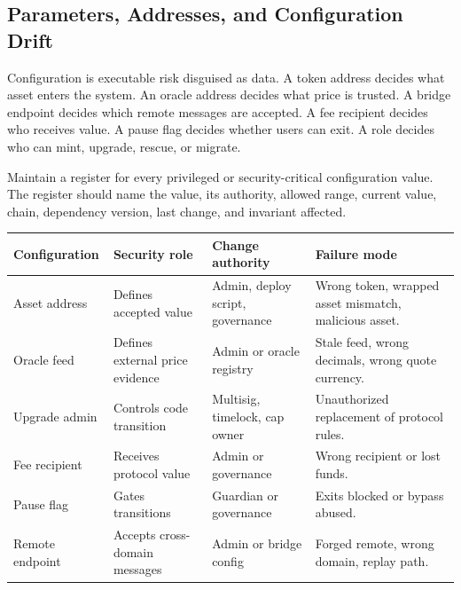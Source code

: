 \subsection{Parameters, Addresses, and Configuration Drift}

Configuration is executable risk disguised as data. A token address decides what asset enters the system. An oracle address decides what price is trusted. A bridge endpoint decides which remote messages are accepted. A fee recipient decides who receives value. A pause flag decides whether users can exit. A role decides who can mint, upgrade, rescue, or migrate.

\begin{artifactbox}
Maintain a register for every privileged or security-critical configuration value. The register should name the value, its authority, allowed range, current value, chain, dependency version, last change, and invariant affected.
\end{artifactbox}

\begin{table}[htbp]
\centering
\small
\renewcommand{\arraystretch}{1.16}
\begin{tabularx}{\textwidth}{@{}>{\RaggedRight\arraybackslash}p{}>{\RaggedRight\arraybackslash}p{}>{\RaggedRight\arraybackslash}p{}X@{}}
\toprule
Configuration & Security role & Change authority & Failure mode \\
\midrule
Asset address & Defines accepted value & Admin, deploy script, governance & Wrong token, wrapped asset mismatch, malicious asset. \\
Oracle feed & Defines external price evidence & Admin or oracle registry & Stale feed, wrong decimals, wrong quote currency. \\
Upgrade admin & Controls code transition & Multisig, timelock, cap owner & Unauthorized replacement of protocol rules. \\
Fee recipient & Receives protocol value & Admin or governance & Wrong recipient or lost funds. \\
Pause flag & Gates transitions & Guardian or governance & Exits blocked or bypass abused. \\
Remote endpoint & Accepts cross-domain messages & Admin or bridge config & Forged remote, wrong domain, replay path. \\
\bottomrule
\end{tabularx}
\end{table}


